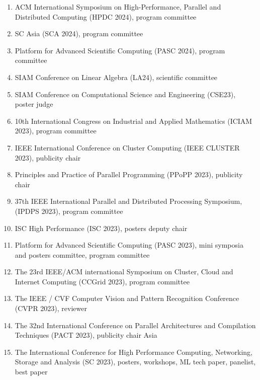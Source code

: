 \documentclass[margin,line]{cv}
\begin{document}
\begin{resume}
\begin{enumerate}
\item ACM International Symposium on High-Performance, Parallel and Distributed Computing (HPDC 2024), program committee

\item SC Asia (SCA 2024), program committee

\item Platform for Advanced Scientific Computing (PASC 2024), program committee

\item SIAM Conference on Linear Algebra (LA24), scientific committee

\item SIAM Conference on Computational Science and Engineering (CSE23), poster judge

\item 10th International Congress on Industrial and Applied Mathematics (ICIAM 2023), program committee

\item IEEE International Conference on Cluster Computing (IEEE CLUSTER 2023), publicity chair

\item Principles and Practice of Parallel Programming (PPoPP 2023), publicity chair

\item 37th IEEE International Parallel and Distributed Processing Symposium, (IPDPS 2023), program committee

\item ISC High Performance (ISC 2023), posters deputy chair

\item Platform for Advanced Scientific Computing (PASC 2023), mini symposia and posters committee, program committee

\item The 23rd IEEE/ACM international Symposium on Cluster, Cloud and Internet Computing (CCGrid 2023), program committee

\item The IEEE / CVF Computer Vision and Pattern Recognition Conference (CVPR 2023), reviewer

\item The 32nd International Conference on Parallel Architectures and Compilation Techniques (PACT 2023), publicity chair Asia

\item The International Conference for High Performance Computing, Networking, Storage and Analysis (SC 2023), posters, workshops, ML tech paper, panelist, best paper


\end{enumerate}
\end{resume}
\end{document}
